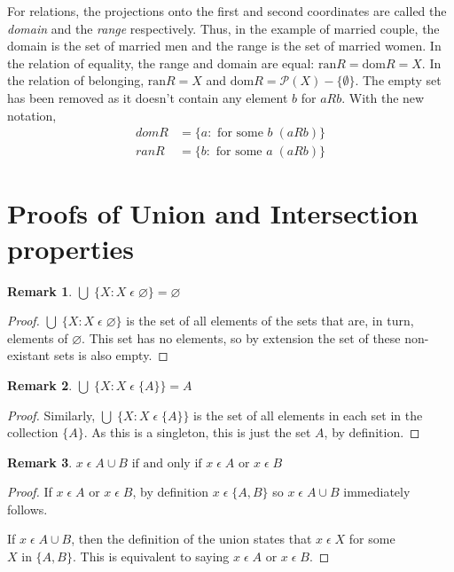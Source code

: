 \documentclass[12pt]{article}
\newtheorem{remark}{Remark}
\begin{document}
For relations, the projections onto the first and second coordinates are called the \textit{domain} and the \textit{range}
respectively. Thus, in the example of married couple, the domain is the set of married men and the range is the
set of married women. In the relation of equality, the range and domain are equal: $\text{ran} R = \text{dom} R = X$. In the
relation of belonging, $\text{ran} R = X$ and $\text{dom} R = \mathcal{P}(X) - \{\emptyset\}$. The empty set has been removed
as it doesn't contain any element $b$ for $a R b$. With the new notation,
\begin{align*}
    dom R &= \{a: \text{ for some } b \;(a R b)\}\\
    ran R &= \{b: \text{ for some } a \;(a R b)\}
\end{align*}






\appendix
\section{Proofs of Union and Intersection properties}\label{Appendix: Unions and Intersections proofs}
\begin{remark}
    $\bigcup\;\{X: X\;\epsilon\;\varnothing\} = \varnothing$
\end{remark}
\begin{proof}
    $\bigcup\;\{X: X\;\epsilon\;\varnothing\}$ is the set of all elements of the sets that are, in turn,
    elements of $\varnothing$. This set has no elements, so by extension the set of these non-existant
    sets is also empty.
\end{proof}

\begin{remark}
    $\bigcup\;\{X: X\;\epsilon\;\{A\}\} = A$
\end{remark}
\begin{proof}
    Similarly, $\bigcup\;\{X: X\;\epsilon\;\{A\}\}$ is the set of all elements in each set in the
    collection $\{A\}$. As this is a singleton, this is just the set $A$, by definition.
\end{proof}


\begin{remark}
    $x\;\epsilon\;A \cup B \text{ if and only if } x\;\epsilon\;A \text{ or } x\;\epsilon\;B$
\end{remark}
\begin{proof}
    If $x\;\epsilon\;A \text{ or } x\;\epsilon\;B$, by definition $x\;\epsilon\;\{A, B\}$ so $x\;\epsilon\;A \cup B$
    immediately follows.

    If $x\;\epsilon\;A \cup B$, then the definition of the union states that $x\;\epsilon\;X$ for some
    $X \text{ in } \{A, B\}$. This is equivalent to saying $x\;\epsilon\;A \text{ or } x\;\epsilon\;B$.
\end{proof}
\end{document}
